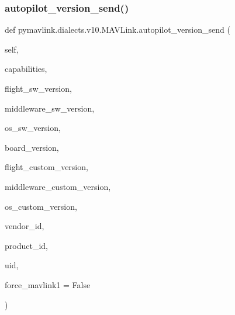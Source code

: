 \subsubsection{\texorpdfstring{autopilot\+\_\+version\+\_\+send()}{autopilot\_version\_send()}}
{\footnotesize\ttfamily def pymavlink.\+dialects.\+v10.\+M\+A\+V\+Link.\+autopilot\+\_\+version\+\_\+send (\begin{DoxyParamCaption}\item[{}]{self,  }\item[{}]{capabilities,  }\item[{}]{flight\+\_\+sw\+\_\+version,  }\item[{}]{middleware\+\_\+sw\+\_\+version,  }\item[{}]{os\+\_\+sw\+\_\+version,  }\item[{}]{board\+\_\+version,  }\item[{}]{flight\+\_\+custom\+\_\+version,  }\item[{}]{middleware\+\_\+custom\+\_\+version,  }\item[{}]{os\+\_\+custom\+\_\+version,  }\item[{}]{vendor\+\_\+id,  }\item[{}]{product\+\_\+id,  }\item[{}]{uid,  }\item[{}]{force\+\_\+mavlink1 = {\ttfamily False} }\end{DoxyParamCaption})}


